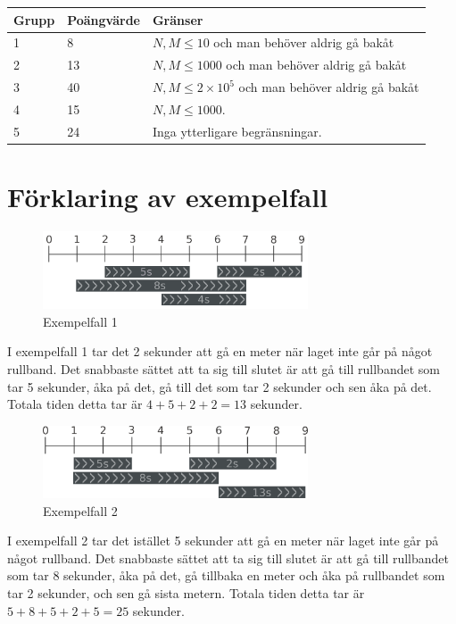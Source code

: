 \noindent
\begin{tabular}{| l | l | l |}
\hline
Grupp & Poängvärde & Gränser \\ \hline
1     & 8          &  $N,M \le 10$ och man behöver aldrig gå bakåt\\ \hline
2     & 13         &  $N,M \le 1000$ och man behöver aldrig gå bakåt\\ \hline
3     & 40         &  $N,M \le 2\times10^5$ och man behöver aldrig gå bakåt\\ \hline
4     & 15         &  $N,M \le 1000$. \\ \hline
5     & 24         &  Inga ytterligare begränsningar. \\ \hline
\end{tabular}

\section*{Förklaring av exempelfall}

\begin{figure}[h]
	\centering
\includegraphics[width=0.7\textwidth]{sample1}
\caption{Exempelfall 1}
\end{figure}
I exempelfall 1 tar det 2 sekunder att gå en meter när laget inte går på något rullband.
Det snabbaste sättet att ta sig till slutet är att gå till rullbandet som
tar 5 sekunder, åka på det, gå till det som tar 2 sekunder och sen åka på det.
Totala tiden detta tar är $4+5+2+2=13$ sekunder.



\begin{figure}[h]
	\centering
\includegraphics[width=0.7\textwidth]{sample2}
\caption{Exempelfall 2}
\end{figure}
I exempelfall 2 tar det istället 5 sekunder att gå en meter när laget inte går på något rullband.
Det snabbaste sättet att ta sig till slutet är att gå till rullbandet som
tar 8 sekunder, åka på det, gå tillbaka en meter och åka på
rullbandet som tar 2 sekunder, och sen gå sista metern.
Totala tiden detta tar är $5+8+5+2+5=25$ sekunder.
